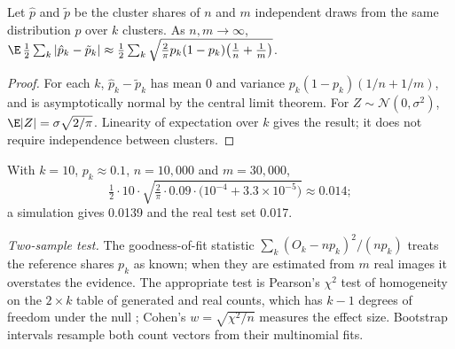 \begin{proposition}\label{prop:tvfloor}
Let $\hat p$ and $\tilde p$ be the cluster shares of $n$ and $m$ independent draws from the same distribution $p$ over $k$ clusters. As $n,m\to\infty$,
$\E\,\tfrac12\sum_k|\hat p_k-\tilde p_k|\approx\tfrac12\sum_k\sqrt{\tfrac{2}{\pi}p_k(1-p_k)\big(\tfrac1n+\tfrac1m\big)}$.
\end{proposition}
\begin{proof}
For each $k$, $\hat p_k-\tilde p_k$ has mean 0 and variance $p_k(1-p_k)(1/n+1/m)$, and is asymptotically normal by the central limit theorem. For $Z\sim\mathcal N(0,\sigma^2)$, $\E|Z|=\sigma\sqrt{2/\pi}$. Linearity of expectation over $k$ gives the result; it does not require independence between clusters.
\end{proof}
With $k=10$, $p_k\approx0.1$, $n=10{,}000$ and $m=30{,}000$,
\[
\tfrac12\cdot10\cdot\sqrt{\tfrac2\pi\cdot0.09\cdot\big(10^{-4}+3.3\times10^{-5}\big)}\approx0.014 ;
\]
a simulation gives 0.0139 and the real test set 0.017.

\emph{Two-sample test.} The goodness-of-fit statistic $\sum_k(O_k-np_k)^2/(np_k)$ treats the reference shares $p_k$ as known; when they are estimated from $m$ real images it overstates the evidence. The appropriate test is Pearson's $\chi^2$ test of homogeneity on the $2\times k$ table of generated and real counts, which has $k-1$ degrees of freedom under the null \citep[\S3.2]{agresti2013cda}; Cohen's $w=\sqrt{\chi^2/n}$ \citep{cohen1988power} measures the effect size. Bootstrap intervals \citep{efron1979bootstrap} resample both count vectors from their multinomial fits.

